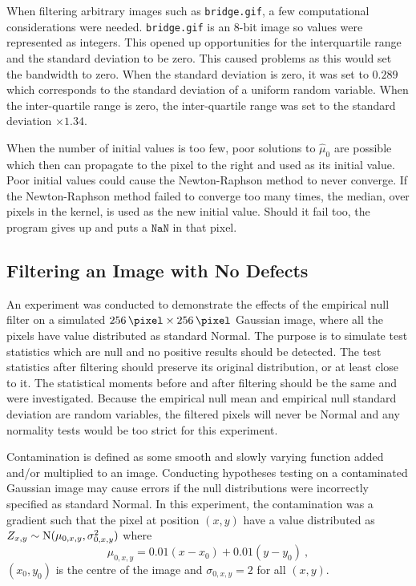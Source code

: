 When filtering arbitrary images such as \texttt{bridge.gif}, a few computational considerations were needed. \texttt{bridge.gif} is an 8-bit image so values were represented as integers. This opened up opportunities for the interquartile range and the standard deviation to be zero. This caused problems as this would set the bandwidth to zero. When the standard deviation is zero, it was set to $0.289$ which corresponds to the standard deviation of a uniform random variable. When the inter-quartile range is zero, the inter-quartile range was set to the standard deviation $\times 1.34$.

When the number of initial values is too few, poor solutions to $\widehat{\mu}_0$ are possible which then can propagate to the pixel to the right and used as its initial value. Poor initial values could cause the Newton-Raphson method to never converge. If the Newton-Raphson method failed to converge too many times, the median, over pixels in the kernel, is used as the new initial value. Should it fail too, the program gives up and puts a $\texttt{NaN}$ in that pixel.

\subsection{Filtering an Image with No Defects}

An experiment was conducted to demonstrate the effects of the empirical null filter on a simulated $\SI{256}{\pixel}\times\SI{256}{\pixel}$ Gaussian image, where all the pixels have value distributed as standard Normal. The purpose is to simulate test statistics which are null and no positive results should be detected. The test statistics after filtering should preserve its original distribution, or at least close to it. The statistical moments before and after filtering should be the same and were investigated. Because the empirical null mean and empirical null standard deviation are random variables, the filtered pixels will never be Normal and any normality tests would be too strict for this experiment.

Contamination is defined as some smooth and slowly varying function added and/or multiplied to an image. Conducting hypotheses testing on a contaminated Gaussian image may cause errors if the null distributions were incorrectly specified as standard Normal. In this experiment, the contamination was a gradient such that the pixel at position $(x,y)$ have a value distributed as $Z_{x,y}\sim\operatorname{N}(\mu_{0,x,y},\sigma_{0,x,y}^2)$ where
\begin{equation}
  \mu_{0,x,y} = 0.01 (x-x_0) + 0.01 (y-y_0) \ ,
\end{equation}
$(x_0,y_0)$ is the centre of the image and $\sigma_{0,x,y}=2$ for all $(x,y)$.

